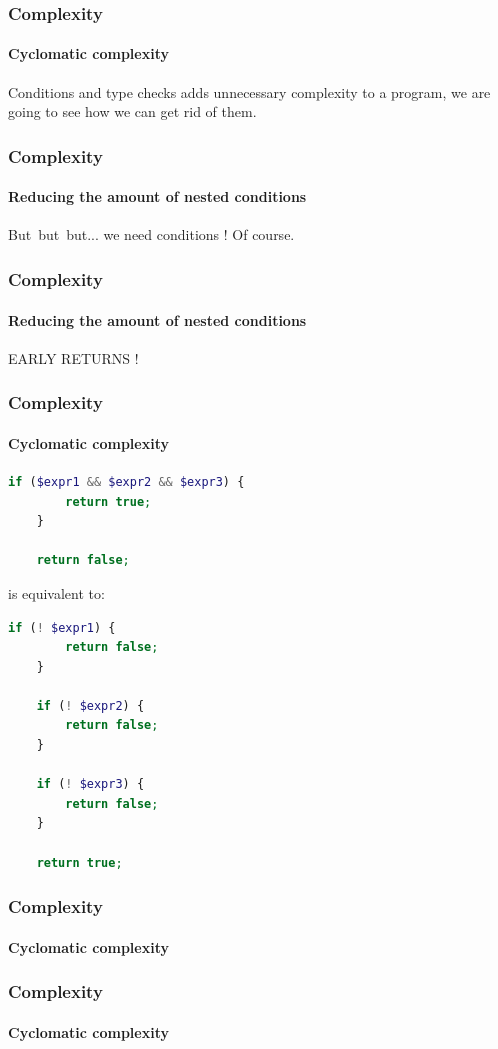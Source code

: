 \begin{frame}[fragile,c]
    \frametitle{Complexity}
    \framesubtitle{Cyclomatic complexity}

    Conditions and type checks adds unnecessary complexity to a program,
    we are going to see how we can get rid of them.
\end{frame}

\begin{frame}[fragile,c]
    \frametitle{Complexity}
    \framesubtitle{Reducing the amount of nested conditions}

    But\pause\ but\pause\ but\pause ... we need conditions !
    \pause
    Of course.
\end{frame}

\begin{frame}[fragile,c]
    \frametitle{Complexity}
    \framesubtitle{Reducing the amount of nested conditions}

    EARLY RETURNS !
\end{frame}

\begin{frame}[fragile,c]
    \frametitle{Complexity}
    \framesubtitle{Cyclomatic complexity}

    \begin{lstlisting}[language=php]
    if ($expr1 && $expr2 && $expr3) {
        return true;
    }

    return false;
    \end{lstlisting}

    \pause

    is equivalent to:

    \begin{lstlisting}[language=php]
    if (! $expr1) {
        return false;
    }

    if (! $expr2) {
        return false;
    }

    if (! $expr3) {
        return false;
    }

    return true;
    \end{lstlisting}
\end{frame}

\begin{frame}
    \frametitle{Complexity}
    \framesubtitle{Cyclomatic complexity}

    
\end{frame}

\begin{frame}
    \frametitle{Complexity}
    \framesubtitle{Cyclomatic complexity}


\pause

\end{frame}

